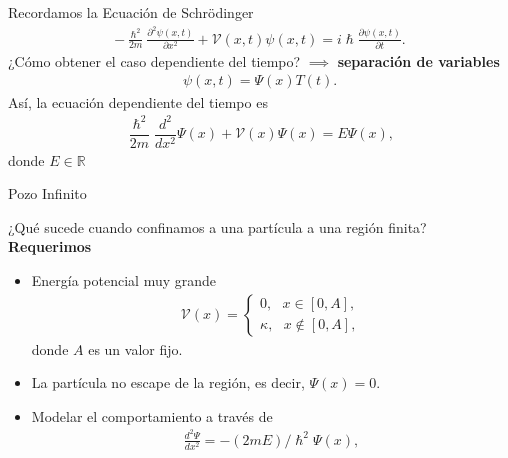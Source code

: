 \documentclass[aspectratio=1610]{beamer}
\newcommand*{\field}[1]{\mathbb{#1}}
\begin{document}
\bgroup
\begin{frame}{}
Recordamos la Ecuación de Schrödinger
\begin{align}
    -\frac{\hslash^2}{2m}\frac{\partial^2\psi(x,t)}{\partial x^2} + \mathcal{V}(x,t)\psi(x,t) = i\hslash\frac{\partial\psi(x,t)}{\partial t}.
    \label{eq:ECDepTiemp}
\end{align}
\vspace{0.05\textheight} 
¿Cómo obtener el caso dependiente del tiempo? $\implies$ \textbf{separación de variables}
    \begin{align*}
    \psi(x,t) = \Psi(x)T(t).
    \end{align*}
\vspace{0.05\textheight} 
Así, la ecuación dependiente del tiempo es 
\begin{align}
\dfrac{\hslash^2}{2m}\dfrac{d^2}{dx^2}\Psi(x) + \mathcal{V}(x)\Psi(x) = E \Psi(x),
\label{eq:HamiltonianEigenValues}
\end{align}
donde $E \in \field{R}$

\end{frame}



\begin{frame}{Pozo Infinito}
 
¿Qué sucede cuando confinamos a una partícula a una región finita? 
\vspace{0.05\textheight} 
\textbf{Requerimos}
\begin{itemize}
    \item Energía potencial muy grande
    \begin{align*}
        \mathcal{V}(x) = 
        \left\{ \begin{array}{ll}
        0, \:\:\:  x \in [0,A],
        \\
        \kappa, \:\:\: x \notin [0,A],
        \end{array}
        \right.
    \end{align*}
    donde $A$ es un valor fijo.
    \item La partícula no escape de la región, es decir, $\Psi(x) = 0$.
    \vspace{0.05\textheight} 
    \item Modelar el comportamiento a través de
    \begin{align}
    \frac{d^2\Psi}{dx^2} = -(2mE)/\hslash^2\Psi(x),
    \label{eq:PozoInfinito}
    \end{align}
\end{itemize}
\begin{columns}
\column{37em}
\end{columns}
\end{frame}
\end{document}
